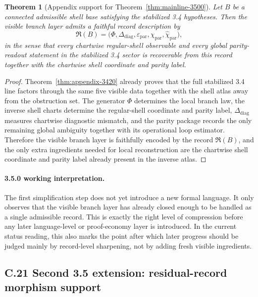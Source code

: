 \documentclass[12pt,a4paper]{article}
\newtheorem{theorem}{Theorem}[section]
\begin{document}
\begin{theorem}[Appendix support for Theorem~\ref{thm:mainline-3500}]
\label{thm:appendix-3500}
Let $B$ be a connected admissible shell base satisfying the stabilized 3.4 hypotheses. Then the visible branch layer admits a faithful record description by
\[
 \mathfrak R(B)=\bigl(\Phi,\Delta_{\mathrm{diag}},\varepsilon_{\mathrm{par}},\chi_{\mathrm{par}},\widehat\chi_{\mathrm{par}}\bigr),
\]
in the sense that every chartwise regular-shell observable and every global parity-readout statement in the stabilized 3.4 sector is recoverable from this record together with the chartwise shell coordinate and parity label.
\end{theorem}

\begin{proof}
Theorem~\ref{thm:appendix-3420} already proves that the full stabilized 3.4 line factors through the same five visible data together with the shell atlas away from the obstruction set. The generator $\Phi$ determines the local branch law, the inverse shell charts determine the regular-shell coordinate and parity label, $\Delta_{\mathrm{diag}}$ measures chartwise diagnostic mismatch, and the parity package records the only remaining global ambiguity together with its operational loop estimator. Therefore the visible branch layer is faithfully encoded by the record $\mathfrak R(B)$, and the only extra ingredients needed for local reconstruction are the chartwise shell coordinate and parity label already present in the inverse atlas.
\end{proof}

\paragraph{3.5.0 working interpretation.}
The first simplification step does not yet introduce a new formal language. It only observes that the visible branch layer has already closed enough to be handled as a single admissible record. This is exactly the right level of compression before any later language-level or proof-economy layer is introduced. In the current status reading, this also marks the point after which later progress should be judged mainly by record-level sharpening, not by adding fresh visible ingredients.



\subsection*{C.21 Second 3.5 extension: residual-record morphism support}
\end{document}
